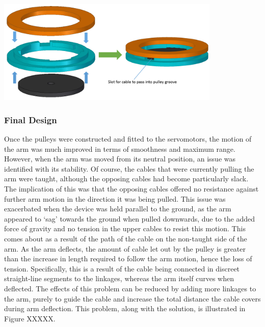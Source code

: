 \documentclass[11pt]{article}
\begin{document}
\begin{center}
\includegraphics[width=0.8\textwidth]{images/pulleyDesign.png}
\label{figure:pulleyDesign}
\end{center}



\subsubsection{Final Design}

Once the pulleys were constructed and fitted to the servomotors, the motion of the arm was much improved in terms of smoothness and maximum range. However, when the arm was moved from its neutral position, an issue was identified with its stability. Of course, the cables that were currently pulling the arm were taught, although the opposing cables had become particularly slack. The implication of this was that the opposing cables offered no resistance against further arm motion in the direction it was being pulled. This issue was exacerbated when the device was held parallel to the ground, as the arm appeared to `sag' towards the ground when pulled downwards, due to the added force of gravity and no tension in the upper cables to resist this motion. This comes about as a result of the path of the cable on the non-taught side of the arm. As the arm deflects, the amount of cable let out by the pulley is greater than the increase in length required to follow the arm motion, hence the loss of tension. Specifically, this is a result of the cable being connected in discreet straight-line segments to the linkages, whereas the arm itself curves when deflected. The effects of this problem can be reduced by adding more linkages to the arm, purely to guide the cable and increase the total distance the cable covers during arm deflection. This problem, along with the solution, is illustrated in Figure XXXXX.
\end{document}
